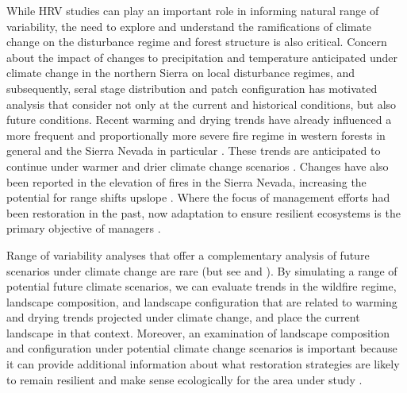 
While HRV studies can play an important role in informing natural range of variability, the need to explore and understand the ramifications of climate change on the disturbance regime and forest structure is also critical. Concern about the impact of changes to precipitation and temperature anticipated under climate change in the northern Sierra on local disturbance regimes, and subsequently, seral stage distribution and patch configuration has motivated analysis that consider not only at the current and historical conditions, but also future conditions\citep{Fule2008,North2012}.
%
Recent warming and drying trends have already influenced a more frequent and proportionally more severe fire regime in western forests in general and the Sierra Nevada in particular \citep{McKenzie2004,Westerling2011,Miller2012}. These trends are anticipated to continue under warmer and drier climate change scenarios \citep{Westerling2008,Dale2001}. Changes have also been reported in the elevation of fires in the Sierra Nevada, increasing the potential for range shifts upslope \citep{Schwartz2015}. Where the focus of management efforts had been restoration in the past, now adaptation to ensure resilient ecosystems is the primary objective of managers \citep{Stephens2010}.

Range of variability analyses that offer a complementary analysis of future scenarios under climate change are rare (but see \cite{Keane2008} and \cite{Duveneck2014}). By simulating a range of potential future climate scenarios, we can evaluate trends in the wildfire regime, landscape composition, and landscape configuration that are related to warming and drying trends projected under climate change, and place the current landscape in that context. Moreover, an examination of landscape composition and configuration under potential climate change scenarios is important because it can provide additional information about what restoration strategies are likely to remain resilient and make sense ecologically for the area under study \citep{Duncan2010}.


